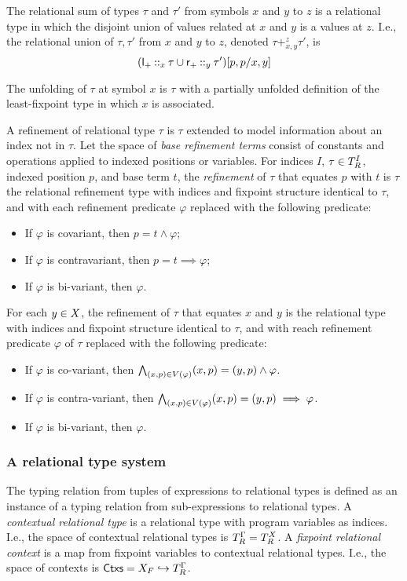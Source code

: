 The relational sum of types $\tau$ and $\tau'$ from symbols $x$ and
$y$ to $z$ is a relational type in which the disjoint union of values
related at $x$ and $y$ is a values at $z$.
%
I.e., the relational union of $\tau, \tau'$ from $x$ and $y$ to $z$,
denoted $\tau +_{x, y}^z \tau'$, is
\[ \replace{ (\tyleftsum \cons_x \tau \union \tyrightsum \cons_y
    \tau')}{ x, y }{ p, p }
\]

%
The unfolding of $\tau$ at symbol $x$ is $\tau$ with a partially
unfolded definition of the least-fixpoint type in which $x$ is
associated.

A refinement of relational type $\tau$ is $\tau$ extended to model
information about an index not in $\tau$.
%
Let the space of \emph{base refinement terms} consist of constants and
operations applied to indexed positions or variables.
%
For indices $I$, $\tau \in \reltypes{I}$, indexed position $p$, and
base term $t$, the \emph{refinement} of $\tau$ that equates $p$ with
$t$ is $\tau$ the relational refinement type with indices and fixpoint
structure identical to $\tau$, and with each refinement predicate
$\varphi$ replaced with the following predicate:
%
\begin{itemize}
\item %
  If $\varphi$ is covariant, then $p = t \land \varphi$;
\item %
  If $\varphi$ is contravariant, then $p = t \implies \varphi$;
\item %
  If $\varphi$ is bi-variant, then $\varphi$.
\end{itemize}
%
For each $y \in \vars$, the refinement of $\tau$ that equates $x$ and
$y$ is the relational type with indices and fixpoint structure
identical to $\tau$, and with reach refinement predicate $\varphi$ of
$\tau$ replaced with the following predicate:
%
\begin{itemize}
\item %
  If $\varphi$ is co-variant, then
  $\bigland_{(x, p) \in \vocab(\varphi)} (x, p) = (y, p) \land \varphi$.
\item %
  If $\varphi$ is contra-variant, then
  $\bigland_{(x, p) \in \vocab(\varphi)} (x, p) = (y, p) \implies \varphi$.
\item %
  If $\varphi$ is bi-variant, then $\varphi$.
\end{itemize}

\subsubsection{A relational type system}
\label{sec:rel-type-sys}
%
The typing relation from tuples of expressions to relational types is
defined as an instance of a typing relation from sub-expressions to
relational types.
A \emph{contextual relational type} is a relational type with program
variables as indices.
%
I.e., the space of contextual relational types is
$\ctxreltypes = \reltypes{\vars}$.
%
A \emph{fixpoint relational context} is a map from fixpoint variables
to contextual relational types.
%
I.e., the space of contexts is
$\ctxs = \fixvars \partto \ctxreltypes$.

